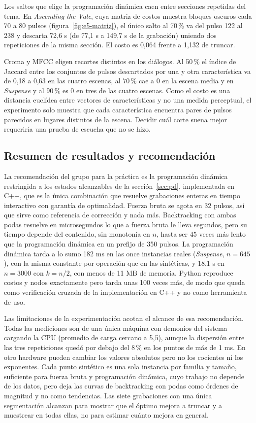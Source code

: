Los saltos que elige la programación dinámica caen entre secciones repetidas del tema. En \emph{Ascending the Vale}, cuya matriz de costos muestra bloques oscuros cada 70 a 80 pulsos (figura~\ref{fig:e5-matriz}), el único salto al 70\,\% va del pulso 122 al 238 y descarta 72,6 s (de 77,1 s a 149,7 s de la grabación) uniendo dos repeticiones de la misma sección. El costo es 0,064 frente a 1,132 de truncar.

Croma y MFCC eligen recortes distintos en los diálogos. Al 50\,\% el índice de Jaccard entre los conjuntos de pulsos descartados por una y otra característica va de 0,18 a 0,63 en las cuatro escenas, al 70\,\% cae a 0 en la escena media y en \emph{Suspense} y al 90\,\% es 0 en tres de las cuatro escenas. Como el costo es una distancia euclídea entre vectores de características y no una medida perceptual, el experimento solo muestra que cada característica encuentra pares de pulsos parecidos en lugares distintos de la escena. Decidir cuál corte suena mejor requeriría una prueba de escucha que no se hizo.

\subsection{Resumen de resultados y recomendación}
\label{sec:recomendacion}

La recomendación del grupo para la práctica es la programación dinámica restringida a los estados alcanzables de la sección~\ref{sec:pd}, implementada en C++, que es la única combinación que resuelve grabaciones enteras en tiempo interactivo con garantía de optimalidad. Fuerza bruta se agota en 32 pulsos, así que sirve como referencia de corrección y nada más. Backtracking con ambas podas resuelve en microsegundos lo que a fuerza bruta le lleva segundos, pero su tiempo depende del contenido, sin monotonía en $n$, hasta ser 45 veces más lento que la programación dinámica en un prefijo de 350 pulsos. La programación dinámica tarda a lo sumo 182 ms en las once instancias reales (\emph{Suspense}, $n = 645$), con la misma constante por operación que en las sintéticas, y 18,1 s en $n = 3000$ con $k = n/2$, con menos de 11 MB de memoria. Python reproduce costos y nodos exactamente pero tarda unas 100 veces más, de modo que queda como verificación cruzada de la implementación en C++ y no como herramienta de uso.

Las limitaciones de la experimentación acotan el alcance de esa recomendación. Todas las mediciones son de una única máquina con demonios del sistema cargando la CPU (promedio de carga cercano a 5,5), aunque la dispersión entre las tres repeticiones quedó por debajo del 8\,\% en los puntos de más de 1 ms. En otro hardware pueden cambiar los valores absolutos pero no los cocientes ni los exponentes. Cada punto sintético es una sola instancia por familia y tamaño, suficiente para fuerza bruta y programación dinámica, cuyo trabajo no depende de los datos, pero deja las curvas de backtracking con podas como órdenes de magnitud y no como tendencias. Las siete grabaciones con una única segmentación alcanzan para mostrar que el óptimo mejora a truncar y a muestrear en todas ellas, no para estimar cuánto mejora en general.
